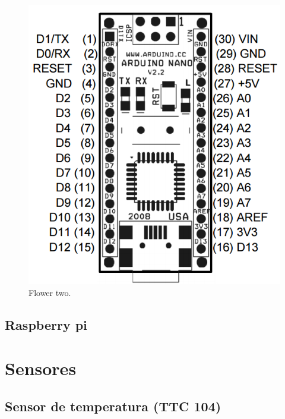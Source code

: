 \begin{figure}[!tbp]
\begin{minipage}[b]{0.4\textwidth}
		\includegraphics[width=\textwidth]{img/hardware/nano-esquema.png}
		\caption{Flower two.}
	\end{minipage}
\end{figure}





\subsection{Raspberry pi }


\section{Sensores}

\subsection{Sensor de temperatura (TTC 104)}

